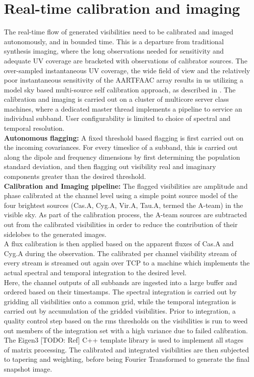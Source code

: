 \documentclass{ws-jai}
\begin{document}
\section {\label{sec:calim} Real-time calibration and imaging}
The real-time  flow of generated visibilities  need to be calibrated  and imaged
autonomously,  and  in bounded  time.   This  is  a departure  from  traditional
synthesis  imaging,  where the  long  observations  needed for  sensitivity  and
adequate UV coverage are bracketed  with observations of calibrator sources. The
over-sampled  instantaneous  UV  coverage,  the  wide  field  of  view  and  the
relatively poor  instantaneous sensitivity of  the AARTFAAC array results  in us
utilizing a model sky based multi-source self calibration approach, as described
in \cite  {prasad2014real}.  The  calibration and  imaging is  carried out  on a
cluster  of multicore  server class  machines, where  a dedicated  master thread
implements a pipeline to service an individual subband.  User configurability is
limited to choice of spectral and temporal resolution.\\

\noindent \textbf  {Autonomous flagging:}  A fixed  threshold based  flagging is
first  carried out  on  the  incoming covariances.   For  every  timeslice of  a
subband, this is carried out along  the dipole and frequency dimensions by first
determining the population standard deviation,  and then flagging out visibility
real and imaginary components greater than the desired threshold.\\

\noindent \textbf  {Calibration and Imaging pipeline:}  The flagged visibilities
are amplitude  and phase calibrated  at the channel  level using a  simple point
source model of  the four brightest sources (Cas.A, Cyg.A,  Vir.A, Tau.A, termed
the A-team) in the visible sky.  As  part of the calibration process, the A-team
sources are subtracted  out from the calibrated visibilities in  order to reduce
the  contribution  of  their  sidelobes   to  the  generated  images.\\  A  flux
calibration is  then applied  based on  the apparent fluxes  of Cas.A  and Cyg.A
during the  observation. The calibrated  per channel visibility stream  of every
stream is streamed out  again over TCP to a machine  which implements the actual
spectral and temporal integration to the desired level.\\

Here, the channel outputs  of all subbands are ingested into  a large buffer and
ordered based on  their timestamps.  The spectral integration is  carried out by
gridding all visibilities onto a common  grid, while the temporal integration is
carried out by accumulation of the gridded visibilities. Prior to integration, a
quality control step based  on the rms thresholds on the  visibilities is run to
weed out  members of  the integration  set with  a high  variance due  to failed
calibration.  The Eigen3  [TODO: Ref] C++ template library is  used to implement
all stages of matrix processing.  The calibrated and integrated visibilities are
then subjected  to tapering and  weighting, before being Fourier  Transformed to
generate the final snapshot image.\\
\end{document}
